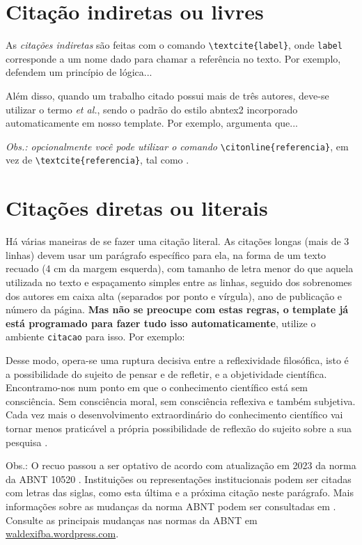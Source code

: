\section{Citação indiretas ou livres}\label{ciação direta}
As \textit{citações indiretas} são feitas com o comando \verb|\textcite{label}|, onde \verb|label| corresponde a um nome dado para chamar a referência no texto. Por exemplo, \textcite{maturana:2003} defendem um princípio de lógica...

Além disso, quando um trabalho citado possui mais de três autores, deve-se utilizar o termo \textit{et al.}, sendo o padrão do estilo {\ttfamily abntex2} incorporado automaticamente em nosso template. Por exemplo, \textcite{teste:2014} argumenta que...

\textit{Obs.: opcionalmente você pode utilizar o comando }\verb|\citonline{referencia}|, em vez de \verb|\textcite{referencia}|, tal como .


\section{Citações diretas ou literais}\label{citacoesdiretas}
Há várias maneiras de se fazer uma citação literal. As citações longas (mais de 3 linhas) devem usar um parágrafo específico para ela, na forma de um texto recuado (4 cm da margem esquerda), com tamanho de letra menor do que aquela utilizada no texto e espaçamento simples entre as linhas, seguido dos sobrenomes dos autores em caixa alta (separados por ponto e vírgula), ano de publicação e número da página. \textbf{Mas não se preocupe com estas regras, o template já está programado para fazer tudo isso automaticamente}, utilize o ambiente \texttt{citacao} para isso. Por exemplo:
\begin{citacao}
Desse modo, opera-se uma ruptura decisiva entre a reflexividade filosófica, isto 	é a possibilidade do sujeito de pensar e de refletir, e a objetividade científica.
Encontramo-nos num ponto em que o conhecimento científico está sem consciência.
Sem consciência moral, sem consciência reflexiva e também subjetiva.
Cada vez mais o desenvolvimento extraordinário do conhecimento científico vai tornar menos praticável a própria possibilidade de reflexão do sujeito sobre a sua pesquisa \cite[p.~28]{morinmoigne:2000}.
\end{citacao}

Obs.: O recuo passou a ser optativo de acordo com atualização em 2023 da norma da ABNT 10520 \cite{NBR10520:2023}. Instituições ou representações institucionais podem ser citadas com letras das siglas, como esta última e a próxima citação neste parágrafo. Mais informações sobre as mudanças da norma ABNT podem ser consultadas em \textcite{abnt2023}. Consulte as principais mudanças nas normas da ABNT em \href{https://waldexifba.wordpress.com/2024/07/26/norma-abnt-principais-mudancas-e-atualizacoes-em-citacoes/}{waldexifba.wordpress.com}.

